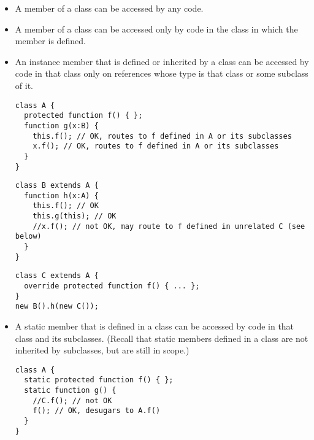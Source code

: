 \begin{itemize}

\item A  member  of a class can be accessed by any code.

\item A  member  of a class can be accessed only by code in
  the class in which the member is defined.

\item An instance  member  that is defined or inherited
  by a class can be accessed by code in that class only on references
  whose type is that class or some subclass of it.

\begin{minipage}{\linewidth}
\begin{verbatim}
class A {
  protected function f() { };
  function g(x:B) {
    this.f(); // OK, routes to f defined in A or its subclasses
    x.f(); // OK, routes to f defined in A or its subclasses
  }
}
\end{verbatim}
\end{minipage}

\begin{minipage}{\linewidth}
\begin{verbatim}
class B extends A {
  function h(x:A) {
    this.f(); // OK
    this.g(this); // OK
    //x.f(); // not OK, may route to f defined in unrelated C (see below)
  }
}
\end{verbatim}
\end{minipage}

\begin{minipage}{\linewidth}
\begin{verbatim}
class C extends A {
  override protected function f() { ... };
}
new B().h(new C());
\end{verbatim}
\end{minipage}

\item A static  member  that is defined in a class
  can be accessed by code in that class and its subclasses. (Recall
  that static members defined in a class are not inherited by
  subclasses, but are still in scope.)

\begin{minipage}{\linewidth}
\begin{verbatim}
class A {
  static protected function f() { };
  static function g() {
    //C.f(); // not OK
    f(); // OK, desugars to A.f()
  }
}
\end{verbatim}
\end{minipage}


\end{itemize}
